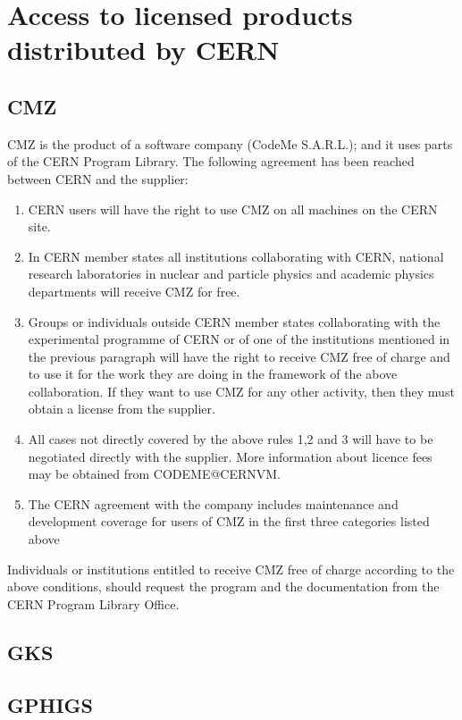 \chapter{Access to licensed products distributed by CERN}
\section{CMZ}
CMZ  is  the product of a software company (CodeMe S.A.R.L.); and it uses parts
of the CERN Program Library. The following agreement has been  reached  between
CERN and the supplier:
\begin{enumerate} 
\item
CERN users will have the right to use CMZ on all machines on the CERN site.
\item 
In  CERN  member  states all institutions collaborating with CERN, national
research laboratories in nuclear and particle physics and academic  physics
departments will receive CMZ for free.
\item 
Groups  or  individuals  outside  CERN member states collaborating with the
experimental programme of CERN or of one of the institutions  mentioned  in
the previous paragraph will have the right to receive CMZ free of charge and to use it for the
work they are doing in the framework of the above  collaboration.  If  they
want  to  use  CMZ  for any other activity, then they must obtain a license
from the supplier.
\item 
All cases not directly covered by the above rules 1,2 and 3 will have to be
negotiated directly with the supplier. More information about
licence fees may be obtained from CODEME@CERNVM.
\item 
The CERN agreement with the company includes  maintenance  and  development
coverage for users of CMZ in the first three categories listed above
\end{enumerate}
 
Individuals or institutions entitled to receive CMZ free of charge according to
the above conditions, should request the program and the documentation from the
CERN Program Library Office.

\section{GKS}

\section{GPHIGS}

